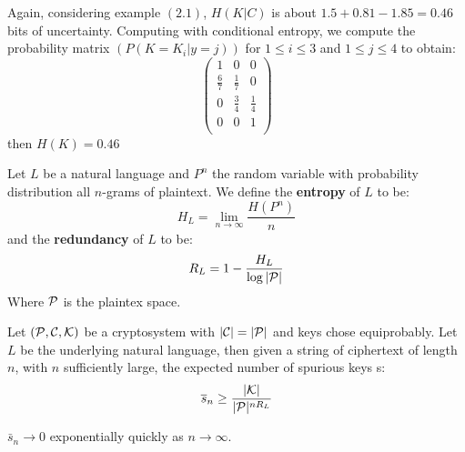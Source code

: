 \begin{example}
    Again, considering example $(2.1)$, $H(K|C)$ is about $1.5+0.81-1.85=0.46$
    bits of uncertainty. Computing with conditional entropy, we compute the
    probability matrix  $(P(K=K_i|y=j))$ for $1 \leq i \leq 3$ and  $1 \leq j
    \leq 4$ to obtain:
    \begin{equation*}
        \begin{pmatrix}
            1           &       0           &           0           \\
            \frac{6}{7} & \frac{1}{7}       &           0           \\
            0           & \frac{3}{4}       &       \frac{1}{4}     \\
            0           &           0       &           1           \\
        \end{pmatrix}
    \end{equation*}
    then $H(K)=0.46$
\end{example}

\begin{definition}
    Let $L$ be a natural language and  $P^n$ the random variable with
    probability distribution all  $n$-grams of plaintext. We define the
    \textbf{entropy} of $L$ to be:
    \begin{equation}
        H_L=\lim_{n \rightarrow \infty}{\frac{H(P^n)}{n}}
    \end{equation}
    and the \textbf{redundancy} of $L$ to be:
    \begin{equation}
        R_L=1-\frac{H_L}{\log{|\mathcal{P}|}}
    \end{equation}
    Where $\mathcal{P}$ is the plaintex space.
\end{definition}

\begin{theorem}\label{2.3.2}
    Let $(\mathcal{P},\mathcal{C},\mathcal{K})$ be a cryptosystem with $|\mathcal{C}|=|\mathcal{P}|$ and keys chose
    equiprobably. Let  $L$ be the underlying natural language, then given a
    string of ciphertext of length  $n$, with  $n$ sufficiently large, the
    expected number of spurious keys s:
    \begin{equation}
        \overline{s}_n \geq \frac{|\mathcal{K}|}{|\mathcal{P}|^{nR_L}}
    \end{equation}
\end{theorem}
\begin{remark}
    $\bar{s}_n \rightarrow 0$ exponentially quickly as $n \rightarrow \infty$.
\end{remark}

